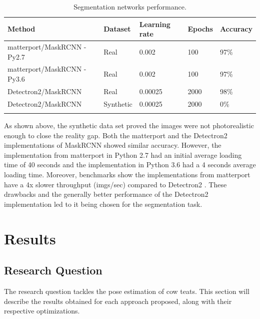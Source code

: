 \begin{longtable}{@{} p{5cm} C{2cm}           C{2.5cm}                   C{1.5cm}           C{1.5cm}         @{}} \toprule
\textbf{Method}              & \textbf{Dataset} & \textbf{Learning rate}   & \textbf{Epochs}  & \textbf{Accuracy}  \\ \midrule
matterport/MaskRCNN - Py2.7         & Real        & 0.002                    &  100             & 97\%          \\ \midrule
matterport/MaskRCNN - Py3.6         & Real        & 0.002                    &  100             & 97\%          \\ \midrule
Detectron2/MaskRCNN                 & Real        & 0.00025                  &  2000            & 98\%          \\ \midrule
Detectron2/MaskRCNN                 & Synthetic        & 0.00025                  &  2000            & 0\%          \\ \bottomrule
\caption{Segmentation networks performance.} \label{tab:train-results}
\end{longtable}


As shown above, the synthetic data set proved the images were not photorealistic enough to close the reality gap. Both the matterport and the Detectron2 implementations of MaskRCNN showed similar accuracy. However, the implementation from matterport in Python 2.7 had an initial average loading time of 40 seconds and the implementation in Python 3.6 had a 4 seconds average loading time. Moreover, benchmarks show the implementations from matterport have a 4x slower throughput (imgs/sec) compared to Detectron2 \cite{2021detectron2-benchmark}. These drawbacks and the generally better performance of the Detectron2 implementation led to it being chosen for the segmentation task. 



\section{Results} \label{chap:4:results}
\subsection{Research Question}
\label{sec:results-research-question}

The research question tackles the pose estimation of cow teats. This section will describe the results obtained for each approach proposed, along with their respective optimizations. 

